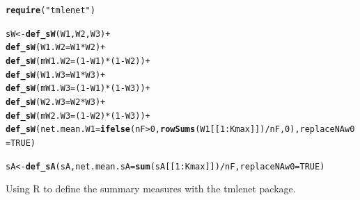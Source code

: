 \documentclass[english]{article}\usepackage[]{graphicx}\usepackage[]{color}
\makeatletter
\newcommand{\hlnum}[1]{\textcolor[rgb]{0.686,0.059,0.569}{#1}}%
\newcommand{\hlstr}[1]{\textcolor[rgb]{0.192,0.494,0.8}{#1}}%
\newcommand{\hlopt}[1]{\textcolor[rgb]{0,0,0}{#1}}%
\newcommand{\hlstd}[1]{\textcolor[rgb]{0.345,0.345,0.345}{#1}}%
\newcommand{\hlkwb}[1]{\textcolor[rgb]{0.69,0.353,0.396}{#1}}%
\newcommand{\hlkwc}[1]{\textcolor[rgb]{0.333,0.667,0.333}{#1}}%
\newcommand{\hlkwd}[1]{\textcolor[rgb]{0.737,0.353,0.396}{\textbf{#1}}}%
\newenvironment{kframe}{%
 \def\at@end@of@kframe{}%
 \ifinner\ifhmode%
  \def\at@end@of@kframe{\end{minipage}}%
  \begin{minipage}{\columnwidth}%
 \fi\fi%
 \def\FrameCommand##1{\hskip\@totalleftmargin \hskip-\fboxsep
 \colorbox{shadecolor}{##1}\hskip-\fboxsep
     \hskip-\linewidth \hskip-\@totalleftmargin \hskip\columnwidth}%
 \MakeFramed {\advance\hsize-\width
   \@totalleftmargin\z@ \linewidth\hsize
   \@setminipage}}%
 {\par\unskip\endMakeFramed%
 \at@end@of@kframe}
\newenvironment{knitrout}{}{} %
\newcommand{\pkg}[1]{{\normalfont\fontseries{b}\selectfont #1}}
\newcommand{\proglang}[1]{\textsf{#1}}
\theoremstyle{plain}
\theoremstyle{plain}
\makeatother
\begin{document}
\begin{knitrout}\footnotesize
{}\color{fgcolor}\begin{kframe}
\begin{alltt}
\hlkwd{require}\hlstd{(}\hlstr{"tmlenet"}\hlstd{)}

\hlstd{sW} \hlkwb{<-} \hlkwd{def_sW}\hlstd{(W1, W2, W3)} \hlopt{+}
  \hlkwd{def_sW}\hlstd{(}\hlkwc{W1.W2} \hlstd{= W1} \hlopt{*} \hlstd{W2)} \hlopt{+}
  \hlkwd{def_sW}\hlstd{(}\hlkwc{mW1.W2} \hlstd{= (}\hlnum{1} \hlopt{-} \hlstd{W1)} \hlopt{*} \hlstd{(}\hlnum{1} \hlopt{-} \hlstd{W2))} \hlopt{+}
  \hlkwd{def_sW}\hlstd{(}\hlkwc{W1.W3} \hlstd{= W1} \hlopt{*} \hlstd{W3)} \hlopt{+}
  \hlkwd{def_sW}\hlstd{(}\hlkwc{mW1.W3} \hlstd{= (}\hlnum{1} \hlopt{-} \hlstd{W1)} \hlopt{*} \hlstd{(}\hlnum{1} \hlopt{-} \hlstd{W3))} \hlopt{+}
  \hlkwd{def_sW}\hlstd{(}\hlkwc{W2.W3} \hlstd{= W2} \hlopt{*} \hlstd{W3)} \hlopt{+}
  \hlkwd{def_sW}\hlstd{(}\hlkwc{mW2.W3} \hlstd{= (}\hlnum{1} \hlopt{-} \hlstd{W2)} \hlopt{*} \hlstd{(}\hlnum{1} \hlopt{-} \hlstd{W3))} \hlopt{+}
  \hlkwd{def_sW}\hlstd{(}\hlkwc{net.mean.W1} \hlstd{=} \hlkwd{ifelse}\hlstd{(nF} \hlopt{>} \hlnum{0}\hlstd{,} \hlkwd{rowSums}\hlstd{(W1[[}\hlnum{1}\hlopt{:}\hlstd{Kmax]])}\hlopt{/}\hlstd{nF,} \hlnum{0}\hlstd{),} \hlkwc{replaceNAw0} \hlstd{=} \hlnum{TRUE}\hlstd{)}

\hlstd{sA} \hlkwb{<-} \hlkwd{def_sA}\hlstd{(sA,} \hlkwc{net.mean.sA} \hlstd{=} \hlkwd{sum}\hlstd{(sA[[}\hlnum{1}\hlopt{:}\hlstd{Kmax]])}\hlopt{/}\hlstd{nF,} \hlkwc{replaceNAw0} \hlstd{=} \hlnum{TRUE}\hlstd{)}
\end{alltt}
\end{kframe}
\end{knitrout}

Using \proglang{R} to define the summary measures with the \pkg{tmlenet} package.
\end{document}
